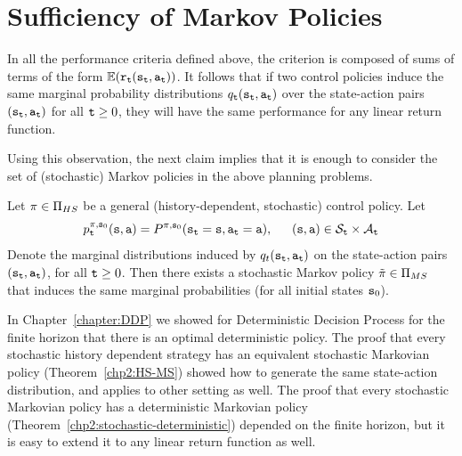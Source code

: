 \section{Sufficiency of Markov Policies}
In all the performance criteria defined above, the criterion is
composed of sums of terms of the form
$\mathbb{E}({{\tt r}_{\tt t}}({{\tt s}_{\tt t}},{{\tt a}_{\tt t}}))$. It follows
that if two control policies induce the same marginal probability
distributions ${q_{\tt t}}({{\tt s}_{\tt t}},{{\tt a}_{\tt t}})$ over
the state-action pairs $({{\tt s}_{\tt t}},{{\tt a}_{\tt t}})$ for all
${\tt t} \ge 0$, they will have the same performance for any linear
return function.

Using this observation, the next claim implies that it is enough to
consider the set of (stochastic) Markov policies in the above
planning problems.

\begin{proposition}\label{prop:sufficient} Let  $\pi  \in {\Pi _{HS}}$ be a general (history-dependent, stochastic) control policy.  Let
\[p_{\tt t}^{\pi ,{{\tt s}_0}}({\tt s},{\tt a}) = {P^{\pi ,{{\tt s}_0}}}({{\tt s}_{\tt t}} = {\tt s},{{\tt a}_{\tt t}} = {\tt a}),\quad \;\;({\tt s},{\tt a}) \in {\mathcal{S}_{\tt t}} \times {\mathcal{A}_{\tt t}}\]
Denote the marginal distributions induced by
$q_t({{\tt s}_{\tt t}},{{\tt a}_{\tt t}})$ on the state-action pairs
$({{\tt s}_{\tt t}},{{\tt a}_{\tt t}})$, for all ${\tt t} \ge 0$. Then there
exists a stochastic Markov policy $\tilde {\pi} \in {\Pi_{MS}}$
that induces the same marginal probabilities (for all initial states
${{\tt s}_0}$).
\end{proposition}


In Chapter~\ref{chapter:DDP}  we showed for Deterministic Decision
Process for the finite horizon that there is an optimal
deterministic policy. The proof that every stochastic history
dependent strategy has an equivalent stochastic Markovian policy
(Theorem~\ref{chp2:HS-MS}) showed how to generate the same
state-action distribution, and applies to other setting as well. The
proof that every stochastic Markovian policy has a deterministic
Markovian policy (Theorem~\ref{chp2:stochastic-deterministic})
depended on the finite horizon, but it is easy to extend it to any
linear return function as well.

